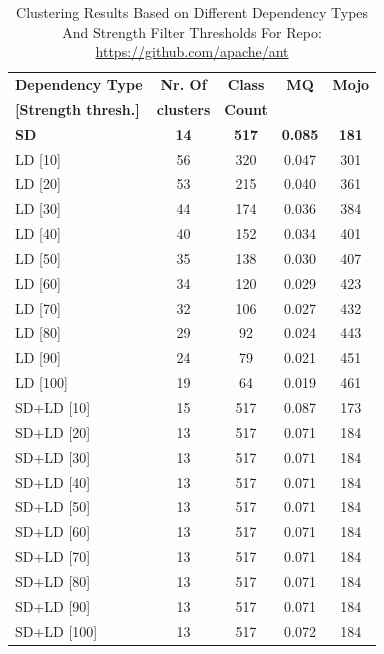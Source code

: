 \documentclass{ieeeaccess}
\begin{document}
\begin{table}[h]
\caption{Clustering Results Based on Different Dependency Types And Strength Filter Thresholds For Repo: \url{https://github.com/apache/ant}}
\label{tab:clustering_results_ant}
\centering
\setlength{\tabcolsep}{10pt}
\begin{tabular}{|l|c|c|c|c|}
\hline
\textbf{Dependency Type} & \textbf{Nr. Of} & \textbf{Class} & \textbf{MQ} & \textbf{Mojo} \\
\textbf{[Strength thresh.]} & \textbf{clusters} & \textbf{Count} &  &  \\
\hline
\textbf{SD} & \textbf{14} & \textbf{517} & \textbf{0.085} & \textbf{181} \\
LD [10] & 56 & 320 & 0.047 & 301 \\
LD [20] & 53 & 215 & 0.040 & 361 \\
LD [30] & 44 & 174 & 0.036 & 384 \\
LD [40] & 40 & 152 & 0.034 & 401 \\
LD [50] & 35 & 138 & 0.030 & 407 \\
LD [60] & 34 & 120 & 0.029 & 423 \\
LD [70] & 32 & 106 & 0.027 & 432 \\
LD [80] & 29 & 92 & 0.024 & 443 \\
LD [90] & 24 & 79 & 0.021 & 451 \\
LD [100] & 19 & 64 & 0.019 & 461 \\
\hline
SD+LD [10] & 15 & 517 & 0.087 & 173 \\
SD+LD [20] & 13 & 517 & 0.071 & 184 \\
SD+LD [30] & 13 & 517 & 0.071 & 184 \\
SD+LD [40] & 13 & 517 & 0.071 & 184 \\
SD+LD [50] & 13 & 517 & 0.071 & 184 \\
SD+LD [60] & 13 & 517 & 0.071 & 184 \\
SD+LD [70] & 13 & 517 & 0.071 & 184 \\
SD+LD [80] & 13 & 517 & 0.071 & 184 \\
SD+LD [90] & 13 & 517 & 0.071 & 184 \\
SD+LD [100] & 13 & 517 & 0.072 & 184 \\
\hline
\end{tabular}
\end{table}
\end{document}

